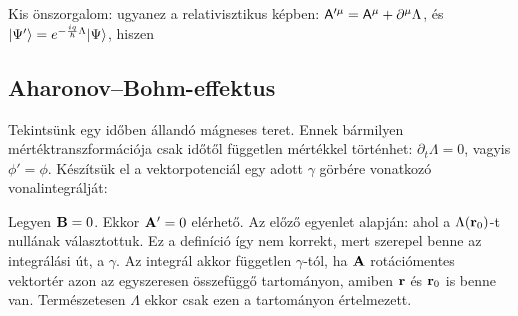    Kis önszorgalom: ugyanez a relativisztikus képben: $\mathsf{A}'^\mu=\mathsf{A}^\mu+\partial^\mu \Lambda$, és $\lvert\Psi'\rangle=e^{-\frac{iq}{\hbar}\Lambda}\lvert\Psi\rangle$, hiszen
   
  \subsection{Aharonov--Bohm-effektus}
   
   Tekintsünk egy időben állandó mágneses teret. Ennek bármilyen mértéktranszformációja csak időtől független mértékkel történhet: $\partial_t\Lambda=0$, vagyis $\phi'=\phi$. Készítsük el a vektorpotenciál egy adott $\gamma$ görbére vonatkozó vonalintegrálját:
   
   Legyen $\mathbf{B}=0$. Ekkor $\mathbf{A}'=0$ elérhető. Az előző egyenlet alapján:
   ahol a $\Lambda(\mathbf{r}_0)$-t nullának választottuk. Ez a definíció így nem korrekt, mert szerepel benne az integrálási út, a $\gamma$. Az integrál akkor független $\gamma$-tól, ha $\mathbf{A}$ rotációmentes vektortér azon az egyszeresen összefüggő tartományon, amiben $\mathbf{r}$ és $\mathbf{r}_0$ is benne van. Természetesen $\Lambda$ ekkor csak ezen a tartományon értelmezett. 
   
